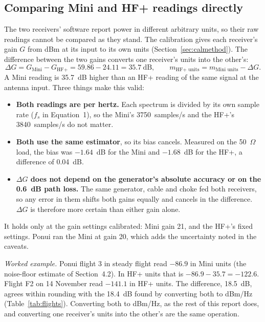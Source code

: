 \documentclass[11pt]{article}
\begin{document}
\subsection{Comparing Mini and HF+ readings directly}
\label{sec:compare}
The two receivers' software report power in different arbitrary units, so their raw readings cannot
be compared as they stand. The calibration gives each receiver's gain $G$ from dBm at its input to its
own units (Section~\ref{sec:calmethod}). The difference between the two gains converts one
receiver's units into the other's:
\begin{equation}
\Delta G = G_\text{Mini} - G_\text{HF+} = 59.86 - 24.11 = 35.7\ \text{dB},
\qquad
m_\text{HF+ units} = m_\text{Mini units} - \Delta G .
\end{equation}
A Mini reading is 35.7~dB higher than an HF+ reading of the same signal at the antenna input.
Three things make this valid:
\begin{itemize}
\item \textbf{Both readings are per hertz.} Each spectrum is divided by its own sample rate
($f_s$ in Equation~1), so the Mini's 3750~samples/s and the HF+'s 3840~samples/s do not matter.
\item \textbf{Both use the same estimator}, so its bias cancels. Measured on the 50~$\Omega$ load,
the bias was $-1.64$~dB for the Mini and $-1.68$~dB for the HF+, a difference of 0.04~dB.
\item \textbf{$\Delta G$ does not depend on the generator's absolute accuracy or on the 0.6~dB path
loss.} The same generator, cable and choke fed both receivers, so any error in them shifts both gains
equally and cancels in the difference. $\Delta G$ is therefore more certain than either gain alone.
\end{itemize}
It holds only at the gain settings calibrated: Mini gain 21, and the HF+'s fixed settings. Ponui ran
the Mini at gain 20, which adds the uncertainty noted in the caveats.

\medskip\noindent\textit{Worked example.} Ponui flight 3 in steady flight read $-86.9$ in Mini units
(the noise-floor estimate of Section~4.2). In HF+ units that is $-86.9 - 35.7 = -122.6$. Flight F2 on
14 November read $-141.1$ in HF+ units. The difference, 18.5~dB, agrees within rounding with the
18.4~dB found by converting both to dBm/Hz (Table~\ref{tab:flights}). Converting both to dBm/Hz, as the
rest of this report does, and converting one receiver's units into the other's are the same
operation.
\end{document}

